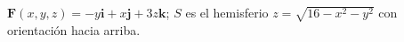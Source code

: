 \item $\mathbf{F}(x,y,z) = -y\mathbf{i} + x\mathbf{j} + 3z\mathbf{k}$; $S$ es el hemisferio $z = \sqrt{16 - x^2 - y^2}$ con orientación hacia arriba.

